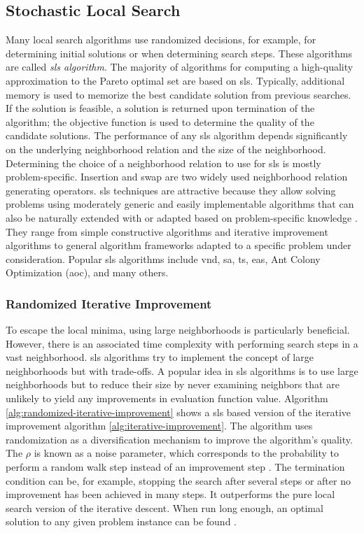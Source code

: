 \subsection{Stochastic Local Search}
Many local search algorithms use randomized decisions, for example, for determining initial solutions or when determining search steps. These algorithms are called \textit{\gls{sls} algorithm}. The majority of algorithms for computing a high-quality approximation to the Pareto optimal set are based on \gls{sls}. Typically, additional memory is used to memorize the best candidate solution from previous searches. If the solution is feasible, a solution is returned upon termination of the algorithm; the objective function is used to determine the quality of the candidate solutions. 
The performance of any \gls{sls} algorithm depends significantly on the underlying neighborhood relation and the size of the neighborhood. Determining the choice of a neighborhood relation to use for \gls{sls} is mostly problem-specific. Insertion and swap are two widely used neighborhood relation generating operators. 
\Gls{sls} techniques are attractive because they allow solving problems using moderately generic and easily implementable algorithms that can also be naturally extended with or adapted based on problem-specific knowledge \parencite{HolgerH2005StochasticSearch}. They range from simple constructive algorithms and iterative improvement algorithms to general algorithm frameworks adapted to a specific problem under consideration. Popular \gls{sls} algorithms include \gls{vnd}, \gls{sa}, \gls{ts}, \glspl{ea}, Ant Colony Optimization (\gls{aoc}), and many others. 

\subsubsection{Randomized Iterative Improvement}
To escape the local minima, using large neighborhoods is particularly beneficial. However, there is an associated time complexity with performing search steps in a vast neighborhood. \Gls{sls} algorithms try to implement the concept of large neighborhoods but with trade-offs. A popular idea in \gls{sls} algorithms is to use large neighborhoods but to reduce their size by never examining neighbors that are unlikely to yield any improvements in evaluation function value. 
Algorithm \ref{alg:randomized-iterative-improvement} shows a \gls{sls} based version of the iterative improvement algorithm \ref{alg:iterative-improvement}. The algorithm uses randomization as a diversification mechanism to improve the algorithm's quality. The $\rho$ is known as a noise parameter, which corresponds to the probability to perform a random walk step instead of an improvement step \parencite{HolgerH2005StochasticSearch}. The termination condition can be, for example, stopping the search after several steps or after no improvement has been achieved in many steps. It outperforms the pure local search version of the iterative descent. When run long enough, an optimal solution to any given problem instance can be found \parencite{HolgerH2005StochasticSearch}.


